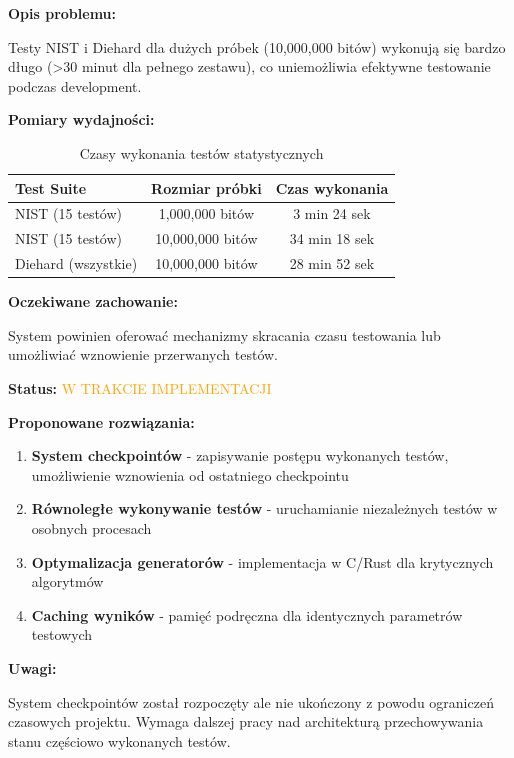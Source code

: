\documentclass[12pt,a4paper]{article}
\begin{document}
\begin{tcolorbox}[colback=yellow!10!white,colframe=yellow!75!black,title=Problem wydajnościowy - Priorytet: WYSOKI]
\textbf{Opis problemu:}

Testy NIST i Diehard dla dużych próbek (10,000,000 bitów) wykonują się bardzo długo (>30 minut dla pełnego zestawu), co uniemożliwia efektywne testowanie podczas development.

\textbf{Pomiary wydajności:}

\begin{table}[H]
\centering
\begin{tabular}{|l|c|c|}
\hline
\textbf{Test Suite} & \textbf{Rozmiar próbki} & \textbf{Czas wykonania} \\
\hline
NIST (15 testów) & 1,000,000 bitów & 3 min 24 sek \\
\hline
NIST (15 testów) & 10,000,000 bitów & 34 min 18 sek \\
\hline
Diehard (wszystkie) & 10,000,000 bitów & 28 min 52 sek \\
\hline
\end{tabular}
\caption{Czasy wykonania testów statystycznych}
\end{table}

\textbf{Oczekiwane zachowanie:}

System powinien oferować mechanizmy skracania czasu testowania lub umożliwiać wznowienie przerwanych testów.

\textbf{Status:} \textcolor{orange}{W TRAKCIE IMPLEMENTACJI}

\textbf{Proponowane rozwiązania:}

\begin{enumerate}
    \item \textbf{System checkpointów} - zapisywanie postępu wykonanych testów, umożliwienie wznowienia od ostatniego checkpointu
    \item \textbf{Równoległe wykonywanie testów} - uruchamianie niezależnych testów w osobnych procesach
    \item \textbf{Optymalizacja generatorów} - implementacja w C/Rust dla krytycznych algorytmów
    \item \textbf{Caching wyników} - pamięć podręczna dla identycznych parametrów testowych
\end{enumerate}

\textbf{Uwagi:}

System checkpointów został rozpoczęty ale nie ukończony z powodu ograniczeń czasowych projektu. Wymaga dalszej pracy nad architekturą przechowywania stanu częściowo wykonanych testów.
\end{tcolorbox}
\end{document}
